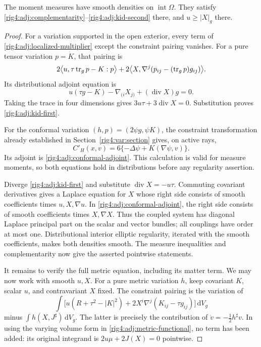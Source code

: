 \begin{lemma}
\label{rig4:adj:interior-equations}
The moment measures have smooth densities on $\operatorname{int}\Omega$.
They satisfy \eqref{rig4:adj:complementarity}--\eqref{rig4:adj:kid-second} there, and
$u\ge|X|_g$ there.
\end{lemma}

\begin{proof}
For a variation supported in the open exterior, every term of
\eqref{rig4:adj:localized-multiplier} except the constraint pairing vanishes.
For a pure tensor variation $p=\dot K$, that pairing is
\[
 2\bigl\langle u,\tau\operatorname{tr}_g p-K:p\bigr\rangle
 +2\bigl\langle X,\nabla^j(p_{ij}-(\operatorname{tr}_g p)g_{ij})\bigr\rangle.
\]
Its distributional adjoint equation is
\begin{equation}
 u(\tau g-K)-\nabla_{(i}X_{j)}+(\operatorname{div}X)g=0.
 \label{rig4:adj:tensor-adjoint}
\end{equation}
Taking the trace in four dimensions gives
$3u\tau+3\operatorname{div}X=0$.  Substitution proves
\eqref{rig4:adj:kid-first}.

For the conformal variation $(h,p)=(2\psi g,\psi K)$, the constraint
transformation already established in Section~\ref{rig4:var:section} gives,
on active rays,
\[
 C'_H(x,v)=6\{-\Delta\psi+K(\nabla\psi,v)\}.
\]
Its adjoint is \eqref{rig4:adj:conformal-adjoint}.  This calculation is valid for
measure moments, so both equations hold in distributions before any
regularity assertion.

Diverge \eqref{rig4:adj:kid-first} and substitute
$\operatorname{div}X=-u\tau$.  Commuting covariant derivatives gives a Laplace
equation for $X$ whose right side consists of smooth coefficients times
$u,X,\nabla u$.  In \eqref{rig4:adj:conformal-adjoint}, the right side consists of
smooth coefficients times $X,\nabla X$.  Thus the coupled system has diagonal
Laplace principal part on the scalar and vector bundles; all couplings have
order at most one.  Distributional interior elliptic regularity, iterated
with the smooth coefficients, makes both densities smooth.  The measure
inequalities and complementarity now give the asserted pointwise statements.

It remains to verify the full metric equation, including its matter term.
We may now work with smooth $u,X$.  For a pure metric variation $h$, keep
covariant $K$, scalar $u$, and contravariant $X$ fixed.  The constraint pairing
is the variation of
\begin{equation}
 \int\bigl[u(R+\tau^2-|K|^2)
      +2X^i\nabla^j(K_{ij}-\tau g_{ij})\bigr]\,\mathrm dV_g
 \label{rig4:adj:metric-functional}
\end{equation}
minus $\int h(X,J^\sharp)\,\mathrm dV_g$.
The latter is precisely the contribution of $\dot v=-\tfrac12h^\sharp v$.
In using the varying volume form in \eqref{rig4:adj:metric-functional}, no term
has been added: its original integrand is
$2u\mu+2J(X)=0$ pointwise.


\end{proof}
